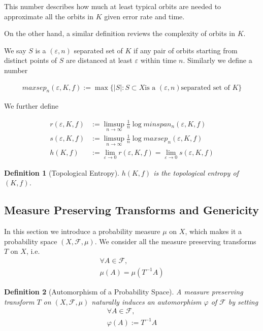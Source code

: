 \documentclass{article}
\newtheorem{definition}{Definition}
\begin{document}
\begin{CJK}{UTF8}{gbsn}
This number describes how much at least typical orbits are needed to approximate all the orbits in $K$ given error rate and time.

\vspace{3ex}

On the other hand, a similar definition reviews the complexity of orbits in $K$.

We say $S$ is a $(\varepsilon,n)$ separated set of $K$ if any pair of orbits starting from distinct points of $S$ are distanced at least $\varepsilon$ within time $n$. Similarly we define a number

\begin{align*}
	maxsep_n(\varepsilon,K,f):=\max\{|S|:S\subset X \mbox{is a } (\varepsilon,n) \mbox{separated set of } K\}
\end{align*}

We further define

\begin{align*}
	r(\varepsilon,K,f)&:=\limsup_{n\rightarrow\infty}\frac{1}{n}\log minspan_n(\varepsilon,K,f) \\
	s(\varepsilon,K,f)&:=\limsup_{n\rightarrow\infty}\frac{1}{n}\log maxsep_n(\varepsilon,K,f) \\
	h(K,f)&:=\lim_{\varepsilon\rightarrow0}r(\varepsilon,K,f)=\lim_{\varepsilon\rightarrow0}s(\varepsilon,K,f)
\end{align*}

\begin{definition}[Topological Entropy]
	$h(K,f)$ is the topological entropy of $(K,f)$.
\end{definition}




\subsection{Measure Preserving Transforms and Genericity}

In this section we introduce a probability measure $\mu$ on $X$, which makes it a probability space $(X,\mathscr{F},\mu)$. We consider all the measure preserving transforms $T$ on $X$, i.e.
\begin{align*}
	\forall A\in\mathscr{F},\\
	\mu(A)=\mu(T^{-1}A)
\end{align*}


\begin{definition}[Automorphism of a Probability Space]
	A measure preserving transform $T$ on $(X,\mathscr{F},\mu)$ naturally induces an automorphism $\varphi$ of $\mathscr{F}$ by setting
	\begin{align*}
	\forall A\in\mathscr{F},\\
		\varphi(A):=T^{-1}A
	\end{align*}
\end{definition}


\end{CJK}
\end{document}

